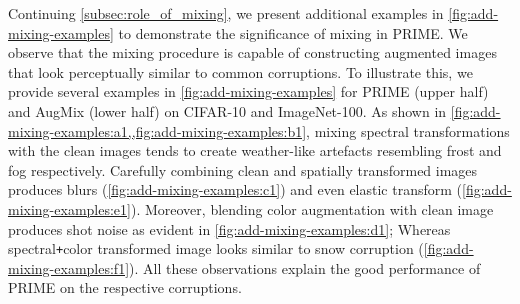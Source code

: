 \documentclass[runningheads]{llncs}
\begin{document}
Continuing \cref{subsec:role_of_mixing}, we present additional examples in \cref{fig:add-mixing-examples} to demonstrate the significance of mixing in PRIME. We observe that the mixing procedure is capable of constructing augmented images that look perceptually similar to common corruptions. To illustrate this, we provide several examples in \cref{fig:add-mixing-examples} for PRIME (upper half) and AugMix (lower half) on CIFAR-10 and ImageNet-100. As shown in \cref{fig:add-mixing-examples:a1,,fig:add-mixing-examples:b1}, mixing spectral transformations with the clean images tends to create weather-like artefacts resembling frost and fog respectively. Carefully combining clean and spatially transformed images produces blurs (\cref{fig:add-mixing-examples:c1}) and even elastic transform (\cref{fig:add-mixing-examples:e1}). Moreover, blending color augmentation with clean image produces shot noise as evident in \cref{fig:add-mixing-examples:d1}; Whereas spectral\texttt{+}color transformed image looks similar to snow corruption (\cref{fig:add-mixing-examples:f1}). All these observations explain the good performance of PRIME on the respective corruptions. 
\end{document}
